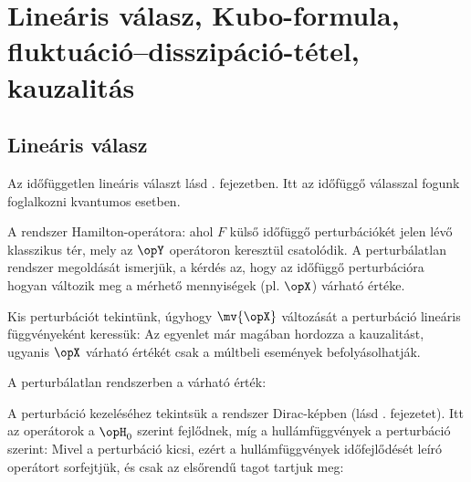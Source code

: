 \chapter{Line\'aris v\'alasz, Kubo-formula, fluktu\'aci\'o--disszip\'aci\'o-t\'etel, kauzalit\'as} 
 
 \section{Lineáris válasz}
  
  Az időfüggetlen lineáris választ lásd . fejezetben.
   Itt az időfüggő válasszal fogunk foglalkozni kvantumos esetben.
  
  A rendszer Hamilton-operátora:
  ahol $F$ külső időfüggő perturbációkét jelen lévő klasszikus tér, mely az $\opY$ operátoron keresztül csatolódik.
   A perturbálatlan rendszer megoldását ismerjük, a kérdés az, hogy az időfüggő perturbációra hogyan változik meg a mérhető mennyiségek (pl. $\opX$) várható értéke. 
  
  Kis perturbációt tekintünk, úgyhogy $\mv{\opX}$ változását a perturbáció lineáris függvényeként keressük:
  Az egyenlet már magában hordozza a kauzalitást, ugyanis $\opX$ várható értékét csak a múltbeli események befolyásolhatják. 
  
  A perturbálatlan rendszerben a várható érték:
  
  A perturbáció kezeléséhez tekintsük a rendszer Dirac-képben (lásd . fejezetet).
   Itt az operátorok a $\opH_0$ szerint fejlődnek, míg a hullámfüggvények a perturbáció szerint:
  Mivel a perturbáció kicsi, ezért a hullámfüggvények időfejlődését leíró operátort sorfejtjük, és csak az elsőrendű tagot tartjuk meg:

